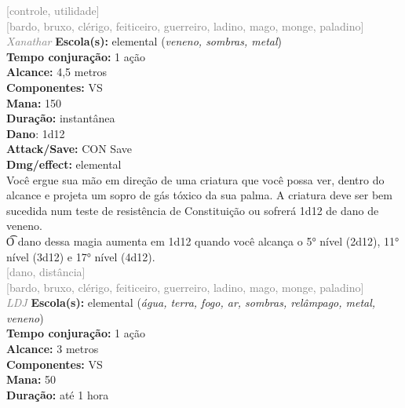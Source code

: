 \documentclass{RPG_Adventure}[2021/10/20]
\begin{document}
{\scriptsize \textcolor{gray}{[controle, utilidade]\\}}
{\scriptsize \textcolor{gray}{[bardo, bruxo, clérigo, feiticeiro, guerreiro, ladino, mago, monge, paladino]\\}}
{\tiny \textcolor{gray}{\textit{Xanathar}}}
{\small \t \textbf{Escola(s):} elemental (\textit{veneno, sombras, metal})\\\t \textbf{Tempo conjuração:} 1 ação\\\t \textbf{Alcance:} 4,5 metros\\\t \textbf{Componentes:} VS\\\t \textbf{Mana:} 150\\\t \textbf{Duração:} instantânea\\\t \textbf{Dano}: 1d12\\\t \textbf{Attack/Save:} CON Save\\\t \textbf{Dmg/effect:} elemental\\}
{\normalsize Você ergue sua mão em direção de uma criatura que você possa ver, dentro do alcance e projeta um sopro de gás tóxico da sua palma. A criatura deve ser bem sucedida num teste de resistência de Constituição ou sofrerá 1d12 de dano de veneno.\\\t O dano dessa magia aumenta em 1d12 quando você alcança o 5° nível (2d12), 11° nível (3d12) e 17° nível (4d12).\\}
{\scriptsize \textcolor{gray}{[dano, distância]\\}}
{\scriptsize \textcolor{gray}{[bardo, bruxo, clérigo, feiticeiro, guerreiro, ladino, mago, monge, paladino]\\}}
{\tiny \textcolor{gray}{\textit{LDJ}}}
{\small \t \textbf{Escola(s):} elemental (\textit{água, terra, fogo, ar, sombras, relâmpago, metal, veneno})\\\t \textbf{Tempo conjuração:} 1 ação\\\t \textbf{Alcance:} 3 metros\\\t \textbf{Componentes:} VS\\\t \textbf{Mana:} 50\\\t \textbf{Duração:} até 1 hora\\}
\end{document}
